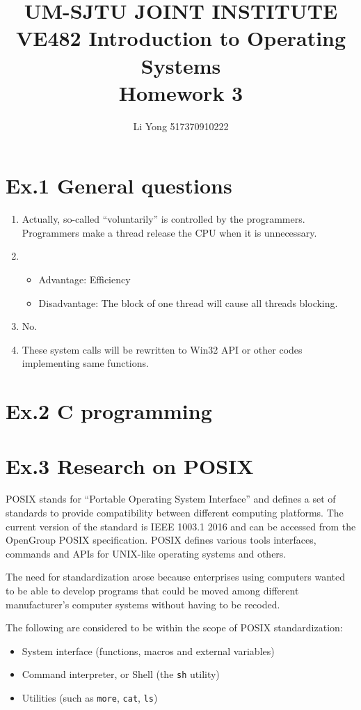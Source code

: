 \documentclass[a4paper]{article}
\title{UM-SJTU JOINT INSTITUTE\\VE482 Introduction to Operating Systems\\\vspace{0.5cm} Homework 3}
\author{Li Yong 517370910222}
\begin{document}
\maketitle
\newpage

\section*{Ex.1 General questions}
\begin{enumerate}
	\item Actually, so-called ``voluntarily'' is controlled by the programmers. Programmers make a thread release the CPU when it is unnecessary.
	\item
	\begin{itemize}
		\item Advantage: Efficiency
		\item Disadvantage: The block of one thread will cause all threads blocking.
	\end{itemize}
	\item No.
	\item These system calls will be rewritten to Win32 API or other codes implementing same functions.
\end{enumerate}

\section*{Ex.2 C programming}

\section*{Ex.3 Research on POSIX}
POSIX stands for ``Portable Operating System Interface'' and defines a set of standards to provide compatibility between different computing platforms. The current version of the standard is IEEE 1003.1 2016 and can be accessed from the OpenGroup POSIX specification. POSIX defines various tools interfaces, commands and APIs for UNIX-like operating systems and others.\par
The need for standardization arose because enterprises using computers wanted to be able to develop programs that could be moved among different manufacturer's computer systems without having to be recoded.\par
The following are considered to be within the scope of POSIX standardization:
\begin{itemize}
	\item System interface (functions, macros and external variables)
	\item Command interpreter, or Shell (the {\tt sh} utility)
	\item Utilities (such as {\tt more}, {\tt cat}, {\tt ls})
\end{itemize}
\end{document}
